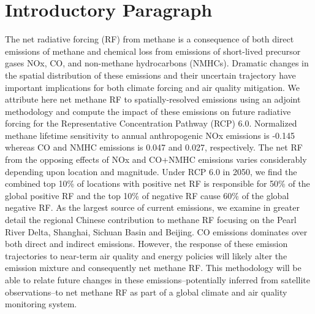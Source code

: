 \section*{Introductory Paragraph}

The net radiative forcing (RF) from methane is a consequence of both direct emissions of methane and chemical loss from emissions of short-lived precursor gases NOx, CO, and non-methane hydrocarbons (NMHCs). Dramatic changes in the spatial distribution of these emissions and their uncertain trajectory have important implications for both climate forcing and air quality mitigation.  We attribute here net methane RF  to spatially-resolved emissions using an adjoint methodology and compute the impact of these emissions on future radiative forcing for the Representative Concentration Pathway (RCP) 6.0.  Normalized methane lifetime sensitivity  to annual anthropogenic NOx emissions is -0.145 whereas  CO and NMHC emissions is 0.047 and 0.027, respectively. The net RF from the opposing effects of NOx and CO+NMHC emissions varies considerably depending upon location and magnitude.  Under RCP 6.0 in 2050,  we find the combined top 10\% of locations with positive net RF is responsible for 50\% of the global positive RF and the top 10\% of negative RF  cause 60\% of the global negative RF. As the largest source of current emissions, we examine in greater detail the regional Chinese contribution to methane RF focusing on the Pearl River Delta, Shanghai, Sichuan Basin and Beijing.  CO emissions dominates over both direct and indirect emissions. However, the response of these emission trajectories to near-term air quality and energy policies will likely alter the emission mixture and consequently net methane RF. This methodology will be able to relate future changes in these emissions--potentially inferred from satellite observations--to net methane RF  as part of a global climate and air quality monitoring system. 